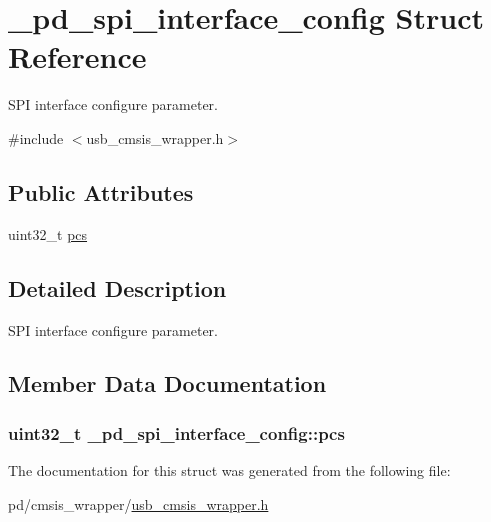 \hypertarget{struct__pd__spi__interface__config}{\section{\-\_\-pd\-\_\-spi\-\_\-interface\-\_\-config Struct Reference}
\label{struct__pd__spi__interface__config}
}


S\-P\-I interface configure parameter.  




{\ttfamily \#include $<$usb\-\_\-cmsis\-\_\-wrapper.\-h$>$}

\subsection*{Public Attributes}
\begin{DoxyCompactItemize}
\item 
uint32\-\_\-t \hyperlink{struct__pd__spi__interface__config_a62ac507496812ca6db95d14263ba3229}{pcs}
\end{DoxyCompactItemize}


\subsection{Detailed Description}
S\-P\-I interface configure parameter. 

\subsection{Member Data Documentation}
\hypertarget{struct__pd__spi__interface__config_a62ac507496812ca6db95d14263ba3229}{
\subsubsection[{pcs}]{\setlength{\rightskip}{0pt plus 5cm}uint32\-\_\-t \-\_\-pd\-\_\-spi\-\_\-interface\-\_\-config\-::pcs}}\label{struct__pd__spi__interface__config_a62ac507496812ca6db95d14263ba3229}


The documentation for this struct was generated from the following file\-:\begin{DoxyCompactItemize}
\item 
pd/cmsis\-\_\-wrapper/\hyperlink{usb__cmsis__wrapper_8h}{usb\-\_\-cmsis\-\_\-wrapper.\-h}\end{DoxyCompactItemize}
